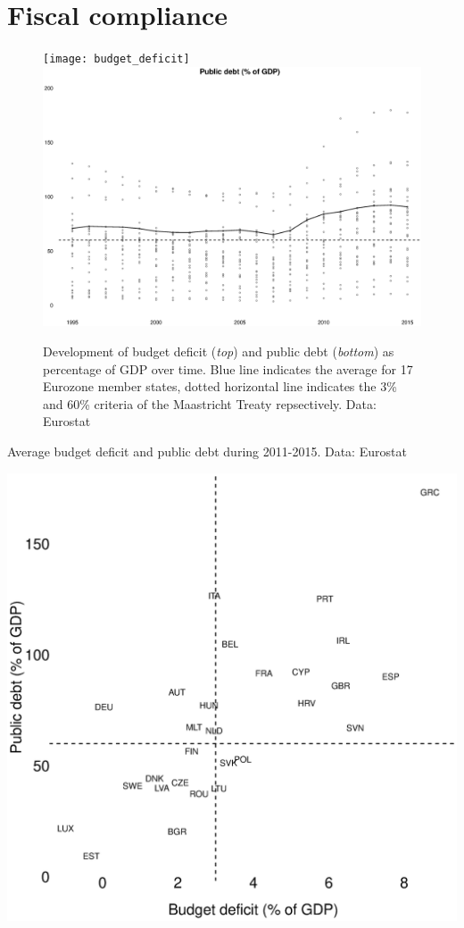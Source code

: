 \documentclass{tufte-handout}
\begin{document}
\section{Fiscal compliance}
\begin{figure}
  \caption{Development of budget deficit (\textit{top}) and public debt (\textit{bottom}) as percentage of GDP over time. Blue line indicates the average for 17 Eurozone member states, dotted horizontal line indicates the 3\% and 60\% criteria of the Maastricht Treaty repsectively. Data: Eurostat}
  \texttt{[image: budget\_deficit]}
  \includegraphics[scale=.2]{public_debt2}
\end{figure}

\begin{marginfigure}
  \caption{Average budget deficit and public debt during 2011-2015. Data: Eurostat}
  \includegraphics[scale=.1]{fiscal_compliance}  
\end{marginfigure}
\end{document}
